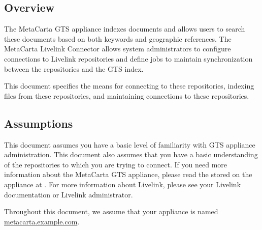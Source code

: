 %
%

\begin{changemargin}{1.5in}{0in}

\section{Overview}

The MetaCarta GTS appliance indexes documents and allows users to search
these documents based on both keywords and geographic references. The
MetaCarta Livelink Connector allows system administrators to configure
connections to Livelink repositories and define jobs to maintain
synchronization between the repositories and the GTS index.

This document specifies the means for connecting to these repositories,
indexing files from these repositories, and maintaining connections to
these repositories.

\subsection{Assumptions}

This document assumes you have a basic level of familiarity with GTS
appliance administration. This document also assumes that you have
a basic understanding of the repositories to which you are trying to
connect. If you need more information about the MetaCarta GTS appliance,
please read the  stored
on the appliance at . For
more information about Livelink, please see your Livelink documentation
or Livelink administrator.

Throughout this document, we assume that your appliance is named \\
\url{metacarta.example.com}. 



\end{changemargin}
